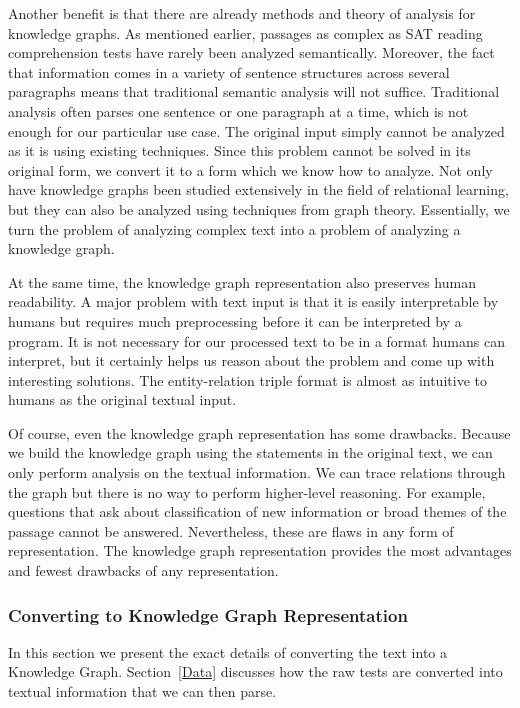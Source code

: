 \documentclass[pageno]{final_paper}
\begin{document}
Another benefit is that there are already methods and theory of analysis for
knowledge graphs. As mentioned earlier, passages as complex as SAT reading
comprehension tests have rarely been analyzed semantically. Moreover, the fact
that information comes in a variety of sentence structures across several
paragraphs means that traditional semantic analysis will not suffice.
Traditional analysis often parses one sentence or one paragraph at a time, which
is not enough for our particular use case. The original input simply cannot be
analyzed as it is using existing techniques. Since this problem cannot be solved
in its original form, we convert it to a form which we know how to analyze. Not
only have knowledge graphs been studied extensively in the field of relational
learning, but they can also be analyzed using techniques from graph theory.
Essentially, we turn the problem of analyzing complex text into a problem of
analyzing a knowledge graph.

At the same time, the knowledge graph representation also preserves human
readability. A major problem with text input is that it is easily interpretable
by humans but requires much preprocessing before it can be interpreted by a
program. It is not necessary for our processed text to be in a format humans can
interpret, but it certainly helps us reason about the problem and come up with
interesting solutions. The entity-relation triple format is almost as intuitive
to humans as the original textual input.

Of course, even the knowledge graph representation has some drawbacks. Because
we build the knowledge graph using the statements in the original text, we can
only perform analysis on the textual information. We can trace relations through
the graph but there is no way to perform higher-level reasoning. For example,
questions that ask about classification of new information or broad themes of
the passage cannot be answered. Nevertheless, these are flaws in any form of
representation. The knowledge graph representation provides the most advantages
and fewest drawbacks of any representation. \\

\subsubsection{Converting to Knowledge Graph Representation}
\label{Converting to Knowledge Graph Representation}

In this section we present the exact details of converting the text into a
Knowledge Graph. Section~\ref{Data} discusses how the raw tests are converted
into textual information that we can then parse.
\end{document}
